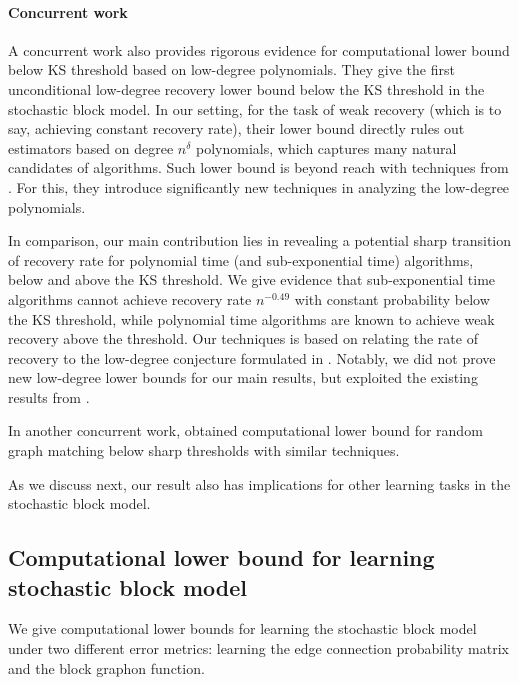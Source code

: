 \paragraph{Concurrent work} A concurrent work \cite{Wein2025sharp} also provides rigorous evidence for computational lower bound below KS threshold based on low-degree polynomials.
They give the first unconditional low-degree recovery lower bound below the KS threshold in the stochastic block model.
In our setting, for the task of weak recovery (which is to say, achieving constant recovery rate), their lower bound directly rules out estimators based on degree $n^\delta$ polynomials, which captures many natural candidates of algorithms.
Such lower bound is beyond reach with techniques from \cite{Hopkins18,bandeira2021spectral}.
For this, they introduce significantly new techniques in analyzing the low-degree polynomials.

In comparison, our main contribution lies in revealing a potential sharp transition of recovery rate for polynomial time (and sub-exponential time) algorithms, 
below and above the KS threshold. We give evidence that sub-exponential time algorithms cannot achieve recovery rate $n^{-0.49}$ with constant probability below the KS threshold,
while polynomial time algorithms are known to achieve weak recovery above the threshold.
Our techniques is based on relating the rate of recovery to the low-degree conjecture formulated in \cite{moitra2023precise}.
Notably, we did not prove new low-degree lower bounds for our main results, but exploited the existing results from \cite{Hopkins18,bandeira2021spectral}.

In another concurrent work, \cite{li2025algorithmiccontiguitylowdegreeconjecture} obtained computational lower bound for random graph matching below sharp thresholds with similar techniques. 


As we discuss next, our result also has implications for other learning tasks in the stochastic block model.



\subsection{Computational lower bound for learning stochastic block model}\label{sec:learning-result}

We give computational lower bounds for learning the stochastic block model under two different error metrics: learning the edge connection probability matrix and the block graphon function. 

